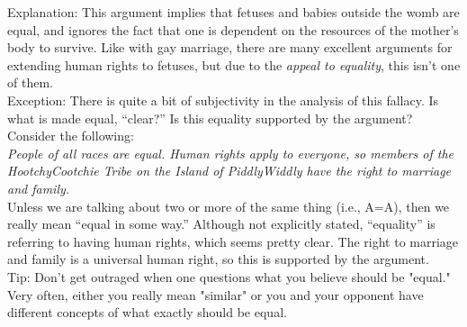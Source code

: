 \documentclass[a4paper,12pt,single,pdftex]{scrartcl}
\begin{document}
    
      Explanation: This argument implies that fetuses and babies outside the womb are equal, and ignores the fact that one is dependent on the resources of the mother's body to survive. Like with gay marriage, there are many excellent arguments for extending human rights to fetuses, but due to the {\it appeal to equality}, this isn't one of them.
    \\

    
      Exception: There is quite a bit of subjectivity in the analysis of this fallacy. Is what is made equal, “clear?” Is this equality supported by the argument? Consider the following:
    \\

    
      {\em People of all races are equal. Human rights apply to everyone, so members of the HootchyCootchie Tribe on the Island of PiddlyWiddly have the right to marriage and family.}
    \\

    
      Unless we are talking about two or more of the same thing (i.e., A=A), then we really mean “equal in some way.” Although not explicitly stated, “equality” is referring to having human rights, which seems pretty clear. The right to marriage and family is a universal human right, so this is supported by the argument.
    \\

    
      Tip: Don't get outraged when one questions what you believe should be "equal." Very often, either you really mean "similar" or you and your opponent have different concepts of what exactly should be equal.
    \\
\end{document}
